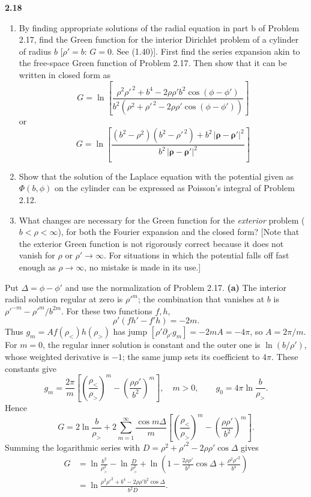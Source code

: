 \par\bigskip
\noindent\textbf{2.18}\quad\begin{enumerate}
\item[(a)] By finding appropriate solutions of the radial equation in part b of Problem 2.17, find the Green function for the interior Dirichlet problem of a cylinder of radius $b$ [$\rho'=b$: $G=0$. See (1.40)]. First find the series expansion akin to the free-space Green function of Problem 2.17. Then show that it can be written in closed form as
\[
G=\ln\left[\frac{\rho^{2}\rho'^{\,2}+b^{4}-2\rho\rho'b^{2}\cos(\phi-\phi')}{b^{2}(\rho^{2}+\rho'^{\,2}-2\rho\rho'\cos(\phi-\phi'))}\right]
\]
or
\[
G=\ln\left[\frac{(b^{2}-\rho^{2})(b^{2}-\rho'^{\,2})+b^{2}\,|\boldsymbol{\rho}-\boldsymbol{\rho}'|^{2}}{b^{2}\,|\boldsymbol{\rho}-\boldsymbol{\rho}'|^{2}}\right]
\]
\item[(b)] Show that the solution of the Laplace equation with the potential given as $\Phi(b,\phi)$ on the cylinder can be expressed as Poisson's integral of Problem 2.12.
\item[(c)] What changes are necessary for the Green function for the \emph{exterior} problem ($b<\rho<\infty$), for both the Fourier expansion and the closed form? [Note that the exterior Green function is not rigorously correct because it does not vanish for $\rho$ or $\rho'\to\infty$. For situations in which the potential falls off fast enough as $\rho\to\infty$, no mistake is made in its use.]
\end{enumerate}
\solution
Put $\Delta=\phi-\phi'$ and use the normalization of Problem 2.17.
\textbf{(a)} The interior radial solution regular at zero is
$\rho'^m$; the combination that vanishes at $b$ is
$\rho'^{-m}-\rho'^m/b^{2m}$. For these two functions $f,h$,
\[
\rho'(fh'-f'h)=-2m.
\]
Thus $g_m=A f(\rho_<)h(\rho_>)$ has jump
$[\rho'\partial_{\rho'}g_m]=-2mA=-4\pi$, so $A=2\pi/m$.
For $m=0$, the regular inner solution is constant and the outer
one is $\ln(b/\rho')$, whose weighted derivative is $-1$; the
same jump sets its coefficient to $4\pi$. These constants give
\[
g_m=\frac{2\pi}{m}
 \left[\left(\frac{\rho_<}{\rho_>}\right)^m
              -\left(\frac{\rho\rho'}{b^2}\right)^m\right],\quad m>0,
\qquad g_0=4\pi\ln\frac b{\rho_>}.
\]
Hence
\[
G=2\ln\frac b{\rho_>}
 +2\sum_{m=1}^\infty\frac{\cos m\Delta}{m}
 \left[\left(\frac{\rho_<}{\rho_>}\right)^m
              -\left(\frac{\rho\rho'}{b^2}\right)^m\right].
\]
Summing the logarithmic series with
$D=\rho^2+\rho'^2-2\rho\rho'\cos\Delta$ gives
\begin{align*}
G&=\ln\frac{b^2}{\rho_>^2}
  -\ln\frac D{\rho_>^2}
  +\ln\left(1-\frac{2\rho\rho'}{b^2}\cos\Delta
                    +\frac{\rho^2\rho'^2}{b^4}\right)\\
&=\boxed{\ln\frac{\rho^2\rho'^2+b^4-2\rho\rho'b^2\cos\Delta}{b^2D}}.
\end{align*}
